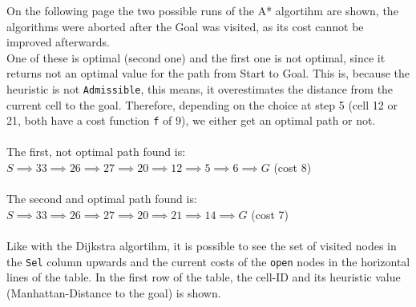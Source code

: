 \documentclass[letta4 paper]{article}
\numberwithin{equation}{section}
\newcommand{\0}{\mathbf{0}}
\begin{document}
	On the following page the two possible runs of the A* algortihm are shown, the algorithms were aborted after the Goal was visited, as its cost cannot be improved afterwards. \\
	One of these is optimal (second one) and the first one is not optimal, since it returns not an optimal value for the path from Start to Goal. This is, because the heuristic is not \texttt{Admissible}, this means, it overestimates the distance from the current cell to the goal. Therefore, depending on the choice at step 5 (cell 12 or 21, both have a cost function \texttt{f} of $9$), we either get an optimal path or not.
	\\
	\\
	The first, not optimal path found is: \\$S \implies 33 \implies 26 \implies 27 \implies 20 \implies 12 \implies 5 \implies 6 \implies G$ (cost 8)
	\\ \\
	The second and optimal path found is:\\ $S \implies 33 \implies 26 \implies 27 \implies 20 \implies 21 \implies 14 \implies G$  (cost 7)
	\\
	\\
	Like with the Dijkstra algortihm, it is possible to see the set of visited nodes in the \texttt{Sel} column upwards and the current costs of the \texttt{open} nodes in the horizontal lines of the table. In the first row of the table, the cell-ID and its heuristic value (Manhattan-Distance to the goal) is shown.
	
	
	
			
\end{document}

